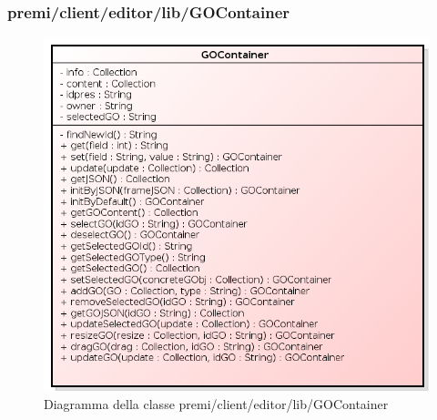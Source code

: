 \subsubsection{premi/client/editor/lib/GOContainer}
\begin{figure}[h]
\begin{center}
\includegraphics[scale=0.40]{img/diacla/GOContainer.png}
\caption{Diagramma della classe premi/client/editor/lib/GOContainer}
\end{center}
\end{figure}

